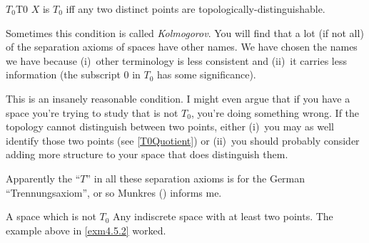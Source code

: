 \begin{dfn}{$T_0$}{T0}
$X$ is \emph{$T_0$} iff any two distinct points are topologically-distinguishable.
\begin{rmk}
Sometimes this condition is called \emph{Kolmogorov}.  You will find that a lot (if not all) of the separation axioms of spaces have other names.  We have chosen the names we have because (i)~other terminology is less consistent and (ii)~it carries less information (the subscript $0$ in $T_0$ has some significance).
\end{rmk}
\begin{rmk}
This is an insanely reasonable condition.  I might even argue that if you have a space you're trying to study that is not $T_0$, you're doing something wrong.  If the topology cannot distinguish between two points, either (i)~you may as well identify those two points (see \cref{T0Quotient}) or (ii)~you should probably consider adding more structure to your space that does distinguish them.
\end{rmk}
\begin{rmk}
Apparently the ``$T$'' in all these separation axioms is for the German ``Trennungsaxiom'', or so Munkres (\cite[pg.~211]{Munkres}) informs me.
\end{rmk}
\end{dfn}
\begin{exm}{A space which is not $T_0$}{}
Any indiscrete space with at least two points.  The example above in \cref{exm4.5.2} worked.
\end{exm}
